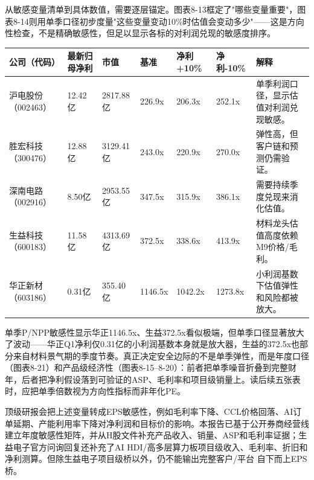 从敏感变量清单到具体数值，需要逐层锚定。图表8-13框定了"哪些变量重要"，图表8-14则用单季口径初步度量"这些变量变动10\%时估值会变动多少"——这是方向性检查，不是精确敏感性，但足以显示各标的对利润兑现的敏感度排序。

\begin{exhibitbox}
\footnotesize
\begin{tabularx}{\textwidth}{L{1.8cm}R{1.7cm}R{2.0cm}R{1.6cm}R{1.6cm}R{1.6cm}X}
\toprule
\textbf{公司（代码）} & \textbf{最新归母净利} & \textbf{市值} & \textbf{基准} & \textbf{净利+10\%} & \textbf{净利-10\%} & \textbf{解释} \\
\midrule
沪电股份（002463） & 12.42亿 & 2817.88亿 & 226.9x & 206.3x & 252.1x & 单季利润口径，显示估值对利润兑现敏感。 \\
胜宏科技（300476） & 12.88亿 & 3129.41亿 & 243.0x & 220.9x & 270.0x & 弹性高，但客户链和预测仍需验证。 \\
深南电路（002916） & 8.50亿 & 2953.55亿 & 347.5x & 315.9x & 386.1x & 需要持续季度兑现来消化估值。 \\
生益科技（600183） & 11.58亿 & 4313.69亿 & 372.5x & 338.6x & 413.9x & 材料龙头估值高度依赖M9价格/毛利。 \\
华正新材（603186） & 0.31亿 & 355.40亿 & 1146.5x & 1042.2x & 1273.8x & 小利润基数下估值弹性和风险都被放大。 \\
\bottomrule
\end{tabularx}
\end{exhibitbox}

单季P/NPP敏感性显示华正1146.5x、生益372.5x看似极端，但单季口径显著放大了波动——华正Q1净利仅0.31亿的小利润基数本身就是放大器，生益的372.5x也部分来自材料景气期的季度节奏。真正决定安全边际的不是单季弹性，而是年度口径（图表8-21）和产品级经济性（图表8-15--8-20）：前者把单季噪音折叠到完整财年，后者把净利假设落到可验证的ASP、毛利率和项目级销量上。读后续五张表时，应把单季倍数视为方向性指标而非年化PE。

\begin{sourcequalitybox}[与顶级报告相比的估值缺口]
顶级研报会把上述变量转成EPS敏感性，例如毛利率下降、CCL价格回落、AI订单延期、产能利用率下降对净利润和目标价的影响。本报告已基于公开券商经营线建立年度敏感性矩阵，并从H股文件补充产品收入、销量、ASP和毛利率证据；生益电子官方问询回复还补充了AI HDI/高多层算力板项目级收入、毛利率、折旧和净利测算。但除生益电子项目级桥以外，仍不能输出完整客户/平台 自下而上EPS 桥。
\end{sourcequalitybox}

